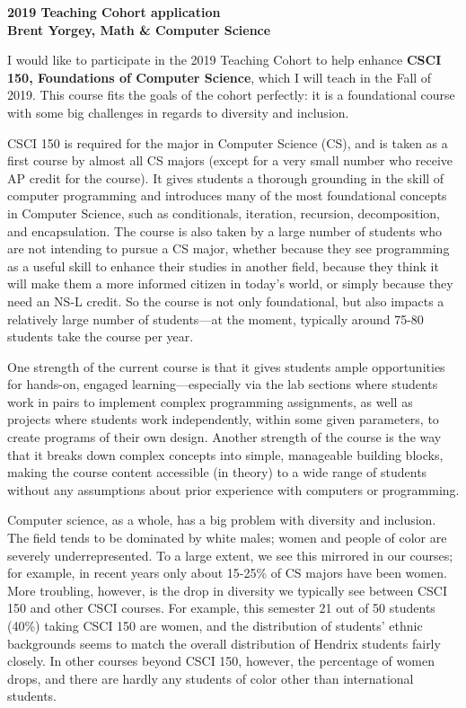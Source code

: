 \documentclass{article}
\begin{document}
\noindent
\textbf{2019 Teaching Cohort application} \\
\textbf{Brent Yorgey, Math \& Computer Science} \bigskip

I would like to participate in the 2019 Teaching Cohort to help
enhance \textbf{CSCI 150, Foundations of Computer Science}, which I
will teach in the Fall of 2019.  This course fits the goals of the
cohort perfectly: it is a foundational course with some big challenges
in regards to diversity and inclusion.

CSCI 150 is required for the major in Computer Science (CS), and is
taken as a first course by almost all CS majors (except for a very
small number who receive AP credit for the course).  It gives students
a thorough grounding in the skill of computer programming and
introduces many of the most foundational concepts in Computer Science,
such as conditionals, iteration, recursion, decomposition, and
encapsulation.  The course is also taken by a large number of students
who are not intending to pursue a CS major, whether because they see
programming as a useful skill to enhance their studies in another
field, because they think it will make them a more informed citizen in
today's world, or simply because they need an NS-L credit.  So the
course is not only foundational, but also impacts a relatively large
number of students---at the moment, typically around 75-80 students
take the course per year.

One strength of the current course is that it gives students ample
opportunities for hands-on, engaged learning---especially via the lab
sections where students work in pairs to implement complex programming
assignments, as well as projects where students work independently,
within some given parameters, to create programs of their own design.
Another strength of the course is the way that it breaks down complex
concepts into simple, manageable building blocks, making the course
content accessible (in theory) to a wide range of students without any
assumptions about prior experience with computers or programming.

Computer science, as a whole, has a big problem with diversity and
inclusion.  The field tends to be dominated by white males; women and
people of color are severely underrepresented.  To a large extent, we
see this mirrored in our courses; for example, in recent years only
about 15-25\% of CS majors have been women.  More troubling, however,
is the drop in diversity we typically see between CSCI 150 and other
CSCI courses.  For example, this semester 21 out of 50 students (40\%)
taking CSCI 150 are women, and the distribution of students' ethnic
backgrounds seems to match the overall distribution of Hendrix
students fairly closely.  In other courses beyond CSCI 150, however,
the percentage of women drops, and there are hardly any students of
color other than international students.
\end{document}
